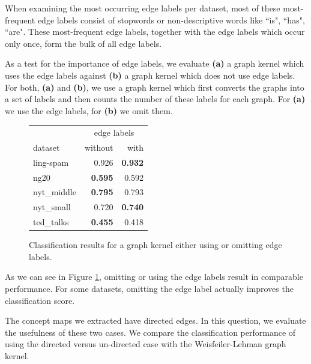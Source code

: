 When examining the most occurring edge labels per dataset, most of these most-frequent edge labels consist of stopwords or non-descriptive words like ``is", ``has", ``are".
These most-frequent edge labels, together with the edge labels which occur only once, form the bulk of all edge labels.

As a test for the importance of edge labels, we evaluate \textbf{(a)} a graph kernel which uses the edge labels against \textbf{(b)} a graph kernel which does not use edge labels.
For both, \textbf{(a)} and \textbf{(b)}, we use a graph kernel which first converts the graphs into a set of labels and then counts the number of these labels for each graph.
For \textbf{(a)} we use the edge labels, for \textbf{(b)} we omit them.

\begin{figure}[htb!]
	\centering
\begin{tabular}{lrr}
	{} & \multicolumn{2}{c}{edge labels} \\
	dataset & without & with \\
	\midrule
	ling-spam  & 0.926 & \textbf{0.932} \\
	ng20       & \textbf{0.595} & 0.592 \\
	nyt\_middle & \textbf{0.795} & 0.793 \\
	nyt\_small  & 0.720 &\textbf{ 0.740} \\
	ted\_talks  & \textbf{0.455} & 0.418 \\
	\bottomrule
\end{tabular}
\caption{Classification results for a graph kernel either using or omitting edge labels.}\label{fig:edge_label_classification}
\end{figure}

As we can see in Figure \ref{fig:edge_label_classification}, omitting or using the edge labels result in comparable performance.
For some datasets, omitting the edge label actually improves the classification score.



The concept maps we extracted have directed edges.
In this question, we evaluate the usefulness of these two cases.
We compare the classification performance of using the directed versus un-directed case with the Weisfeiler-Lehman graph kernel.

